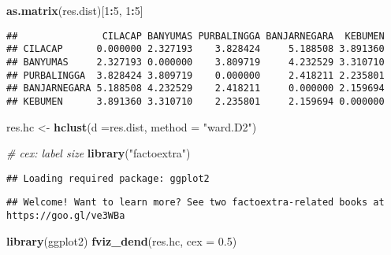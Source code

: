 \documentclass[
]{elegantbook}
\newenvironment{Shaded}{\begin{snugshade}}{\end{snugshade}}
\newcommand{\AttributeTok}[1]{\textcolor[rgb]{0.13,0.29,0.53}{#1}}
\newcommand{\CommentTok}[1]{\textcolor[rgb]{0.56,0.35,0.01}{\textit{#1}}}
\newcommand{\DecValTok}[1]{\textcolor[rgb]{0.00,0.00,0.81}{#1}}
\newcommand{\FloatTok}[1]{\textcolor[rgb]{0.00,0.00,0.81}{#1}}
\newcommand{\FunctionTok}[1]{\textcolor[rgb]{0.13,0.29,0.53}{\textbf{#1}}}
\newcommand{\NormalTok}[1]{#1}
\newcommand{\OtherTok}[1]{\textcolor[rgb]{0.56,0.35,0.01}{#1}}
\newcommand{\SpecialCharTok}[1]{\textcolor[rgb]{0.81,0.36,0.00}{\textbf{#1}}}
\newcommand{\StringTok}[1]{\textcolor[rgb]{0.31,0.60,0.02}{#1}}
\begin{document}
\begin{Shaded}
\begin{Highlighting}[]
\FunctionTok{as.matrix}\NormalTok{(res.dist)[}\DecValTok{1}\SpecialCharTok{:}\DecValTok{5}\NormalTok{, }\DecValTok{1}\SpecialCharTok{:}\DecValTok{5}\NormalTok{]}
\end{Highlighting}
\end{Shaded}

\begin{verbatim}
##               CILACAP BANYUMAS PURBALINGGA BANJARNEGARA  KEBUMEN
## CILACAP      0.000000 2.327193    3.828424     5.188508 3.891360
## BANYUMAS     2.327193 0.000000    3.809719     4.232529 3.310710
## PURBALINGGA  3.828424 3.809719    0.000000     2.418211 2.235801
## BANJARNEGARA 5.188508 4.232529    2.418211     0.000000 2.159694
## KEBUMEN      3.891360 3.310710    2.235801     2.159694 0.000000
\end{verbatim}

\begin{Shaded}
\begin{Highlighting}[]
\NormalTok{res.hc }\OtherTok{\textless{}{-}} \FunctionTok{hclust}\NormalTok{(}\AttributeTok{d =}\NormalTok{res.dist, }\AttributeTok{method =} \StringTok{"ward.D2"}\NormalTok{)}
\end{Highlighting}
\end{Shaded}

\begin{Shaded}
\begin{Highlighting}[]
\CommentTok{\# cex: label size}
\FunctionTok{library}\NormalTok{(}\StringTok{"factoextra"}\NormalTok{)}
\end{Highlighting}
\end{Shaded}

\begin{verbatim}
## Loading required package: ggplot2
\end{verbatim}

\begin{verbatim}
## Welcome! Want to learn more? See two factoextra-related books at https://goo.gl/ve3WBa
\end{verbatim}

\begin{Shaded}
\begin{Highlighting}[]
\FunctionTok{library}\NormalTok{(ggplot2)}
\FunctionTok{fviz\_dend}\NormalTok{(res.hc, }\AttributeTok{cex =} \FloatTok{0.5}\NormalTok{)}
\end{Highlighting}
\end{Shaded}
\end{document}
